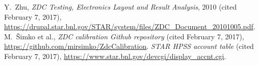 \begin{thebibliography}{9}
  Y.\ Zhu, \textit{ZDC Testing, Electronics Layout and Result Analysis}, 2010
 (cited February 7, 2017),
 \url{https://drupal.star.bnl.gov/STAR/system/files/ZDC_Document_20101005.pdf}.
  M.\ Šimko et al., \textit{ZDC calibration Github repository}
 (cited February 7, 2017), \url{https://github.com/mirsimko/ZdcCalibration}.
  \textit{STAR HPSS account table} (cited February 7, 2017),
 \url{https://www.star.bnl.gov/devcgi/display_accnt.cgi}.
\end{thebibliography}
